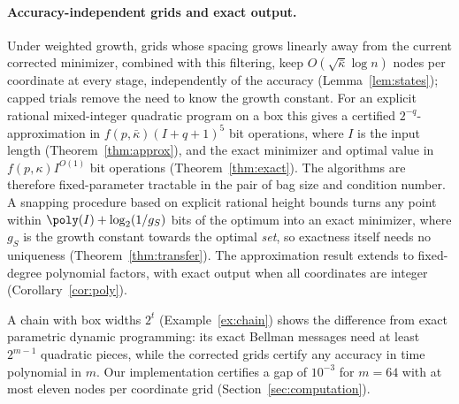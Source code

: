 \paragraph{Accuracy-independent grids and exact output.}
Under weighted growth, grids whose spacing grows linearly away from the
current corrected minimizer, combined with this filtering, keep
$O(\sqrt{\bar\kappa}\log n)$ nodes per coordinate at every stage, independently of
the accuracy (Lemma~\ref{lem:states}); capped trials remove the need to know the
growth constant. For an explicit rational mixed-integer quadratic program on a
box this gives a certified $2^{-q}$-approximation in
$f(p,\bar\kappa)(I+q+1)^5$ bit operations, where $I$ is the input length
(Theorem~\ref{thm:approx}), and the exact minimizer and optimal value in
$f(p,\kappa)I^{O(1)}$ bit operations (Theorem~\ref{thm:exact}). The algorithms
are therefore fixed-parameter tractable in the pair of bag size and condition
number. A snapping procedure based on explicit rational height bounds turns
any point within $\poly(I)+\log_2(1/g_S)$ bits of the optimum into an exact
minimizer, where $g_S$ is the growth constant towards the optimal \emph{set},
so exactness itself needs no uniqueness (Theorem~\ref{thm:transfer}). The
approximation result extends to fixed-degree polynomial factors, with exact
output when all coordinates are integer (Corollary~\ref{cor:poly}).

A chain with box widths $2^t$ (Example~\ref{ex:chain}) shows the difference from
exact parametric dynamic programming: its exact Bellman messages need at least
$2^{m-1}$ quadratic pieces, while the corrected grids certify any accuracy in
time polynomial in $m$. Our implementation certifies a gap of $10^{-3}$ for
$m=64$ with at most eleven nodes per coordinate grid
(Section~\ref{sec:computation}).

